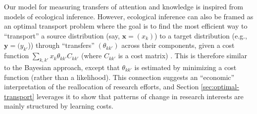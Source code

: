 \documentclass{article}
\begin{document}
Our model for measuring transfers of attention and knowledge is inspired from models of ecological inference. However, ecological inference can also be framed as an optimal transport problem \citep{muzellec2017tsallis,li2019learning} where the goal is to find the most efficient way to  ``transport'' a source distribution (say, $\bm{x}=(x_k)$) to a target distribution (e.g., $\bm{y}=(y_{k'}$)) through ``transfers'' $(\theta_{kk'})$ across their components, given a cost function $\sum_{k,k'} x_{k} \theta_{kk'}C_{kk'}$ (where $C_{kk'}$ is a cost matrix) \citep{Peyre2018}. This is therefore similar to the Bayesian approach, except that $\theta_{kk'}$ is estimated by minimizing a cost function (rather than a likelihood). This connection suggests an ``economic'' interpretation of the reallocation of research efforts, and Section \ref{sec:optimal-transport} leverages it to show that patterns of change in research interests are mainly structured by learning costs. %



\end{document}
